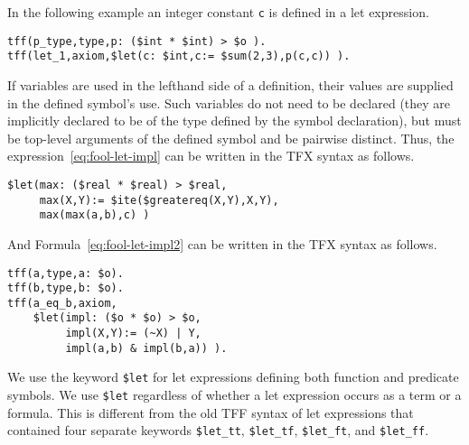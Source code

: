 \documentclass{easychair}
\begin{document}
In the following example an integer constant {\tt c} is defined in a let expression.
\begin{verbatim}
tff(p_type,type,p: ($int * $int) > $o ).
tff(let_1,axiom,$let(c: $int,c:= $sum(2,3),p(c,c)) ).
\end{verbatim}

If variables are used in the lefthand side of a definition, their values are 
supplied in the defined symbol's use. 
Such variables do not need to be declared (they are implicitly declared to be 
of the type defined by the symbol declaration), but must be top-level arguments 
of the defined symbol and be pairwise distinct. Thus, the expression~\ref{eq:fool-let-impl} can be written in the TFX syntax as follows.
\begin{verbatim}
$let(max: ($real * $real) > $real,
     max(X,Y):= $ite($greatereq(X,Y),X,Y),
     max(max(a,b),c) )
\end{verbatim}


And Formula~\ref{eq:fool-let-impl2} can be written in the TFX syntax as follows.
\begin{verbatim}
tff(a,type,a: $o).
tff(b,type,b: $o).
tff(a_eq_b,axiom,
    $let(impl: ($o * $o) > $o,
         impl(X,Y):= (~X) | Y,
         impl(a,b) & impl(b,a)) ).
\end{verbatim}

We use the keyword \verb'$let' for let expressions defining both function and predicate symbols. We use \verb'$let' regardless of whether a let expression occurs as a term or a formula. This is different from the old TFF syntax of let expressions
that contained four separate keywords \verb'$let_tt', \verb'$let_tf', \verb'$let_ft', and \verb'$let_ff'.
\end{document}
